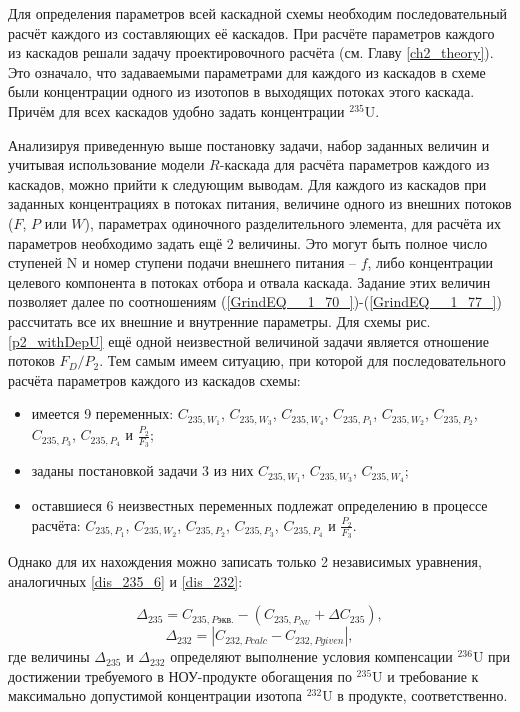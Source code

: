 Для определения параметров всей каскадной схемы необходим последовательный расчёт каждого из составляющих её каскадов. При расчёте параметров каждого из каскадов решали задачу проектировочного расчёта (см. Главу \ref{ch2_theory}). Это означало, что задаваемыми параметрами для каждого из каскадов в схеме были концентрации одного из изотопов в выходящих потоках этого каскада. Причём для всех каскадов удобно задать концентрации $^{235}$U.

Анализируя приведенную выше постановку задачи, набор заданных величин и учитывая использование модели $R$-каскада для расчёта параметров каждого из каскадов, можно прийти к следующим выводам. Для каждого из каскадов при заданных концентрациях в потоках питания, величине одного из внешних потоков ($F$, $P$ или $W$), параметрах одиночного разделительного элемента, для расчёта их параметров необходимо задать ещё 2 величины. Это могут быть полное число ступеней N и номер ступени подачи внешнего питания -- $f$, либо концентрации целевого компонента в потоках отбора и отвала каскада. Задание этих величин позволяет далее по соотношениям (\ref{GrindEQ__1_70_})-(\ref{GrindEQ__1_77_}) рассчитать все их внешние и внутренние параметры. Для схемы рис. \ref{p2_withDepU} ещё одной неизвестной величиной задачи является отношение потоков ${F_{D}}/{P_2}$. Тем самым имеем ситуацию, при которой для последовательного расчёта параметров каждого из каскадов схемы:
\begin{itemize}
    \item имеется 9 переменных: $C_{235,{W_1}}$, $C_{235,{W_3}}$, $C_{235,{W_4}}$, $C_{235,{P_1}}$, $C_{235,{W_2}}$, $C_{235,{P_2}}$, $C_{235,{P_3}}$, $C_{235,{P_4}}$ и $\frac{P_{2}}{F_3}$;
    \item заданы постановкой задачи 3 из них $C_{235,{W_1}}$, $C_{235,{W_3}}$, $C_{235,{W_4}}$;
    \item оставшиеся 6 неизвестных переменных подлежат определению в процессе расчёта: $C_{235,{P_1}}$, $C_{235,{W_2}}$, $C_{235,{P_2}}$,  $C_{235,{P_3}}$, $C_{235,{P_4}}$ и $\frac{P_{2}}{F_3}$. 
\end{itemize}

Однако для их нахождения можно записать только 2 независимых уравнения, аналогичных \ref{dis_235_6} и \ref{dis_232}:

\begin{equation}
    \label{dis_235_6_tr}
    \Delta_{235}=C_{235,P\textit{экв.}}-(C_{235,{P_{NU}}}+\Delta C_{235}),
\end{equation}
\begin{equation}
    \label{dis_232_tr}
    \Delta_{232}=\left|C_{232,P\textit{calc}}-C_{232,P\textit{given}}\right|,
\end{equation}
где величины  $\Delta_{235}$ и $\Delta_{232}$ определяют выполнение условия компенсации $^{236}$U при достижении требуемого в НОУ-продукте обогащения по $^{235}$U и требование к максимально допустимой концентрации изотопа $^{232}$U в продукте, соответственно.

